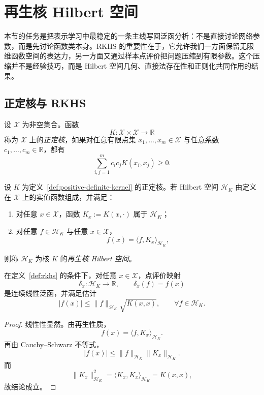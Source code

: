 \section{再生核 Hilbert 空间}

\label{sec:12-1}

本节的任务是把表示学习中最稳定的一条主线写回泛函分析：不是直接讨论网络参数，而是先讨论函数类本身。RKHS 的重要性在于，它允许我们一方面保留无限维函数空间的表达力，另一方面又通过样本点评价把问题压缩到有限参数。这个压缩并不是经验技巧，而是 Hilbert 空间几何、直接法存在性和正则化共同作用的结果。

\subsection{正定核与 RKHS}

\begin{definition}[正定核]\label{def:positive-definite-kernel}
设 $\mathcal X$ 为非空集合。函数
\[
K\colon \mathcal X\times \mathcal X\to \mathbb R
\]
称为 $\mathcal X$ 上的\emph{正定核}，如果对任意有限点集 $x_1,\dots,x_m\in \mathcal X$ 与任意系数 $c_1,\dots,c_m\in \mathbb R$，都有
\[
\sum_{i,j=1}^m c_i c_j K(x_i,x_j)\ge 0.
\]
\end{definition}

\begin{definition}\label{def:rkhs}
设 $K$ 为定义~\ref{def:positive-definite-kernel} 的正定核。若 Hilbert 空间 $\mathcal H_K$ 由定义在 $\mathcal X$ 上的实值函数组成，并满足：
\begin{enumerate}
  \item 对任意 $x\in \mathcal X$，函数 $K_x:=K(x,\cdot)$ 属于 $\mathcal H_K$；
  \item 对任意 $f\in \mathcal H_K$ 与任意 $x\in \mathcal X$，
  \[
  f(x)=\langle f,K_x\rangle_{\mathcal H_K},
  \]
\end{enumerate}
则称 $\mathcal H_K$ 为核 $K$ 的\emph{再生核 Hilbert 空间}。
\end{definition}

\begin{proposition}[点评价泛函连续]\label{prop:rkhs-evaluation-continuity}
在定义~\ref{def:rkhs} 的条件下，对任意 $x\in \mathcal X$，点评价映射
\[
\delta_x\colon \mathcal H_K\to \mathbb R,\qquad \delta_x(f)=f(x)
\]
是连续线性泛函，并满足估计
\[
|f(x)|\le \|f\|_{\mathcal H_K}\sqrt{K(x,x)},
\qquad \forall f\in \mathcal H_K.
\]
\end{proposition}

\begin{proof}
线性性显然。由再生性质，
\[
f(x)=\langle f,K_x\rangle_{\mathcal H_K}.
\]
再由 Cauchy--Schwarz 不等式，
\[
|f(x)|\le \|f\|_{\mathcal H_K}\|K_x\|_{\mathcal H_K}.
\]
而
\[
\|K_x\|_{\mathcal H_K}^2
=
\langle K_x,K_x\rangle_{\mathcal H_K}
=
K(x,x),
\]
故结论成立。
\end{proof}

